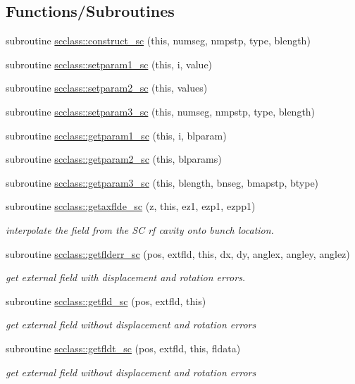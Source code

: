 \subsection*{Functions/\+Subroutines}
\begin{DoxyCompactItemize}
\item 
subroutine \mbox{\hyperlink{namespacescclass_a117b083b5a5a59d050fe5c0a4771332b}{scclass\+::construct\+\_\+sc}} (this, numseg, nmpstp, type, blength)
\item 
subroutine \mbox{\hyperlink{namespacescclass_a23a57a64ee6a74149bbc9cf009ce8711}{scclass\+::setparam1\+\_\+sc}} (this, i, value)
\item 
subroutine \mbox{\hyperlink{namespacescclass_af35b79ac06dc2b6bec2d97f6e745ab20}{scclass\+::setparam2\+\_\+sc}} (this, values)
\item 
subroutine \mbox{\hyperlink{namespacescclass_a656d4cc4d5fe872ffa9df12bab721bec}{scclass\+::setparam3\+\_\+sc}} (this, numseg, nmpstp, type, blength)
\item 
subroutine \mbox{\hyperlink{namespacescclass_a5f02207aa4bb28b292bf39bd5876c7e2}{scclass\+::getparam1\+\_\+sc}} (this, i, blparam)
\item 
subroutine \mbox{\hyperlink{namespacescclass_a036860e8ca9dff4cc79e19ec6c55f86a}{scclass\+::getparam2\+\_\+sc}} (this, blparams)
\item 
subroutine \mbox{\hyperlink{namespacescclass_aaa829fed79c7f89ac09b012687895817}{scclass\+::getparam3\+\_\+sc}} (this, blength, bnseg, bmapstp, btype)
\item 
subroutine \mbox{\hyperlink{namespacescclass_aefc9ea62cf36830e2c74869fff2f1b17}{scclass\+::getaxflde\+\_\+sc}} (z, this, ez1, ezp1, ezpp1)
\begin{DoxyCompactList}\small\item\em interpolate the field from the SC rf cavity onto bunch location. \end{DoxyCompactList}\item 
subroutine \mbox{\hyperlink{namespacescclass_abe42c84df8190cc0443752dff296dd89}{scclass\+::getflderr\+\_\+sc}} (pos, extfld, this, dx, dy, anglex, angley, anglez)
\begin{DoxyCompactList}\small\item\em get external field with displacement and rotation errors. \end{DoxyCompactList}\item 
subroutine \mbox{\hyperlink{namespacescclass_a5af81e94b531e8d02789525f1f4438ac}{scclass\+::getfld\+\_\+sc}} (pos, extfld, this)
\begin{DoxyCompactList}\small\item\em get external field without displacement and rotation errors \end{DoxyCompactList}\item 
subroutine \mbox{\hyperlink{namespacescclass_a73840f6e9b85c73425db1f08ab539aa2}{scclass\+::getfldt\+\_\+sc}} (pos, extfld, this, fldata)
\begin{DoxyCompactList}\small\item\em get external field without displacement and rotation errors \end{DoxyCompactList}\end{DoxyCompactItemize}
